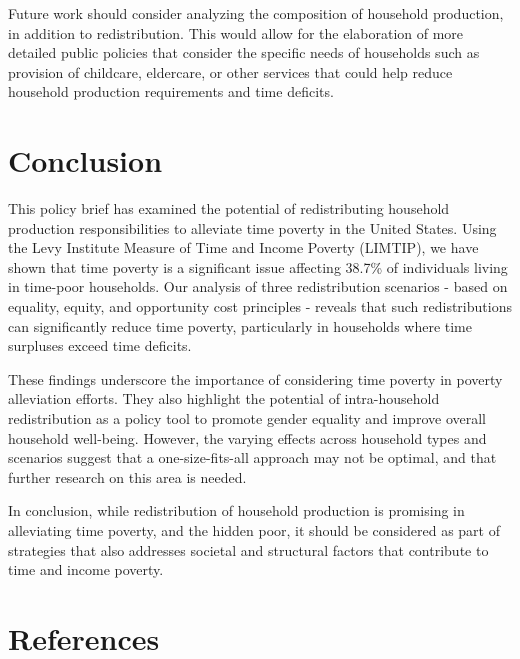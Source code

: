 \documentclass[
  11pt,
]{article}
\begin{document}
Future work should consider analyzing the composition of household
production, in addition to redistribution. This would allow for the
elaboration of more detailed public policies that consider the specific
needs of households such as provision of childcare, eldercare, or other
services that could help reduce household production requirements and
time deficits.

\section{Conclusion}\label{conclusion}

This policy brief has examined the potential of redistributing household
production responsibilities to alleviate time poverty in the United
States. Using the Levy Institute Measure of Time and Income Poverty
(LIMTIP), we have shown that time poverty is a significant issue
affecting 38.7\% of individuals living in time-poor households. Our
analysis of three redistribution scenarios - based on equality, equity,
and opportunity cost principles - reveals that such redistributions can
significantly reduce time poverty, particularly in households where time
surpluses exceed time deficits.

These findings underscore the importance of considering time poverty in
poverty alleviation efforts. They also highlight the potential of
intra-household redistribution as a policy tool to promote gender
equality and improve overall household well-being. However, the varying
effects across household types and scenarios suggest that a
one-size-fits-all approach may not be optimal, and that further research
on this area is needed.

In conclusion, while redistribution of household production is promising
in alleviating time poverty, and the hidden poor, it should be
considered as part of strategies that also addresses societal and
structural factors that contribute to time and income poverty.

\section*{References}\label{sec-ref}
\end{document}
